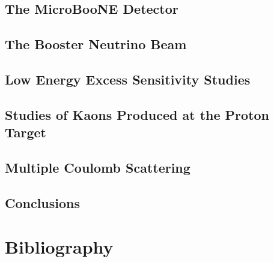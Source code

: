 \documentclass[11pt,openright,twoside,letterpaper,onecolumn]{report} %
\begin{document}
\chapter{The MicroBooNE Detector}
\label{sec:detector}
% 

\chapter{The Booster Neutrino Beam}
\label{sec:beam}


\chapter{Low Energy Excess Sensitivity Studies}
\label{sec:LEEsensitivity}
% 

\chapter{Studies of Kaons Produced at the Proton Target}
\label{sec:kaon}
% 

\chapter{Multiple Coulomb Scattering}
\label{sec:MCS}
% 

\chapter{Conclusions}
\label{sec:conclusions}
% 

% 

\part{Bibliography}
 

\end{document}
